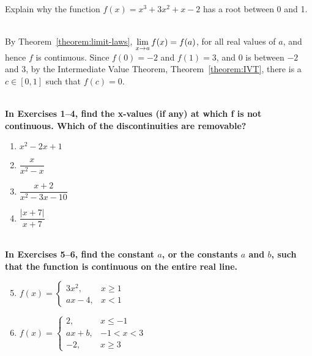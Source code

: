 \begin{example} 
    Explain why the function $f(x) =x^3 + 3x^2+x-2$ has a root between 0 and 1. \cite{mooc}\\
    \begin{solution}~\\
        By Theorem~\ref{theorem:limit-laws}, $\displaystyle\lim\limits_{x\to a} f(x) = f(a)$, for all real values of $a$, and hence $f$ is continuous.  Since $f(0)=-2$ and $f(1)=3$, and $0$ is between $-2$ and $3$, by the Intermediate Value Theorem, Theorem~\ref{theorem:IVT}, there is a $c\in[0,1]$ such
        that $f(c)=0$.
    \end{solution}
\end{example}
    
\begin{exercise}
    ~\\\-\hspace{0.3cm} \textbf{
        In Exercises 1–4, find the x-values (if any) at which f is not continuous. Which of the discontinuities are removable?
    }\cite{ci}\\
    \begin{enumerate} 
		\item $x^2-2x+1$
		\item $\dfrac{x}{x^2-x}$
		\item $\dfrac{x+2}{x^2-3x-10}$
		\item $\dfrac{|x+7|}{x+7}$
    \end{enumerate}
    ~\\\-\hspace{0.3cm} \textbf{
        In Exercises 5–6, find the constant $a$, or the constants $a$ and $b$, such that the function is continuous on the entire real line.
    }\cite{ci}\\
    \begin{enumerate}
        \setcounter{enumi}{4}
        \item $f(x)=\begin{cases}
            3x^2,   &x\geq 1\\
            ax-4,   &x<1
        \end{cases}$
        \item $f(x)=\begin{cases}
            2,      &x\leq -1\\
            ax+b,   &-1<x<3\\
            -2,     &x\geq 3
        \end{cases}$
    \end{enumerate}
\end{exercise}
